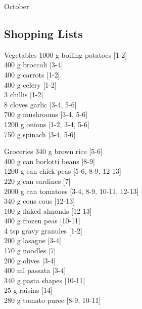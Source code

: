 \begin{menu}{October}
    \subsection*{Shopping Lists}
      \begin{shoppinglist}{Vegetables}
      1000 g boiling potatoes {\scriptsize[1-2]}\\
      400 g broccoli {\scriptsize[3-4]}\\
      400 g carrots {\scriptsize[1-2]}\\
      400 g celery {\scriptsize[1-2]}\\
      3  chillis {\scriptsize[1-2]}\\
      8 cloves garlic {\scriptsize[3-4, 5-6]}\\
      700 g mushrooms {\scriptsize[3-4, 5-6]}\\
      1200 g onions {\scriptsize[1-2, 3-4, 5-6]}\\
      750 g spinach {\scriptsize[3-4, 5-6]}\\
      \end{shoppinglist}%
      \begin{shoppinglist}{Groceries}
      340 g brown rice {\scriptsize[5-6]}\\
      400 g can borlotti beans {\scriptsize[8-9]}\\
      1200 g can chick peas {\scriptsize[5-6, 8-9, 12-13]}\\
      220 g can sardines {\scriptsize[7]}\\
      2000 g can tomatoes {\scriptsize[3-4, 8-9, 10-11, 12-13]}\\
      340 g cous cous {\scriptsize[12-13]}\\
      100 g flaked almonds {\scriptsize[12-13]}\\
      400 g frozen peas {\scriptsize[10-11]}\\
      4 tsp gravy granules {\scriptsize[1-2]}\\
      200 g lasagne {\scriptsize[3-4]}\\
      170 g noodles {\scriptsize[7]}\\
      200 g olives {\scriptsize[3-4]}\\
      400 ml passata {\scriptsize[3-4]}\\
      340 g pasta shapes {\scriptsize[10-11]}\\
      25 g raisins {\scriptsize[14]}\\
      280 g tomato puree {\scriptsize[8-9, 10-11]}\\

\end{shoppinglist}
\end{menu}

